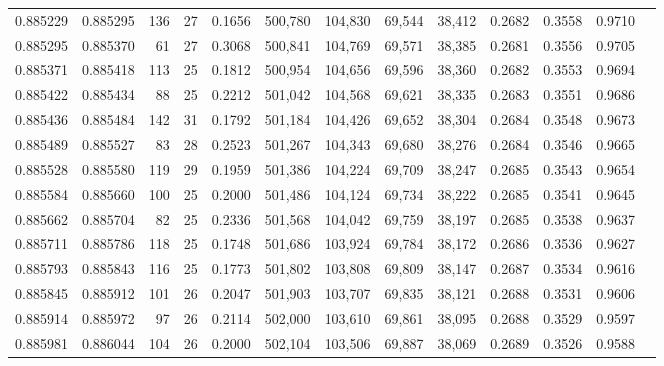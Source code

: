 \begin{tabular}{rrrrrrrrrrrrr}
0.885229 & 0.885295 &   136 &  27 &                                     0.1656 & 500,780 & 104,830 &  69,544 &  38,412 & 0.2682 & 0.3558 & 0.9710 \\
0.885295 & 0.885370 &    61 &  27 &                                     0.3068 & 500,841 & 104,769 &  69,571 &  38,385 & 0.2681 & 0.3556 & 0.9705 \\
0.885371 & 0.885418 &   113 &  25 &                                     0.1812 & 500,954 & 104,656 &  69,596 &  38,360 & 0.2682 & 0.3553 & 0.9694 \\
0.885422 & 0.885434 &    88 &  25 &                                     0.2212 & 501,042 & 104,568 &  69,621 &  38,335 & 0.2683 & 0.3551 & 0.9686 \\
0.885436 & 0.885484 &   142 &  31 &                                     0.1792 & 501,184 & 104,426 &  69,652 &  38,304 & 0.2684 & 0.3548 & 0.9673 \\
0.885489 & 0.885527 &    83 &  28 &                                     0.2523 & 501,267 & 104,343 &  69,680 &  38,276 & 0.2684 & 0.3546 & 0.9665 \\
0.885528 & 0.885580 &   119 &  29 &                                     0.1959 & 501,386 & 104,224 &  69,709 &  38,247 & 0.2685 & 0.3543 & 0.9654 \\
0.885584 & 0.885660 &   100 &  25 &                                     0.2000 & 501,486 & 104,124 &  69,734 &  38,222 & 0.2685 & 0.3541 & 0.9645 \\
0.885662 & 0.885704 &    82 &  25 &                                     0.2336 & 501,568 & 104,042 &  69,759 &  38,197 & 0.2685 & 0.3538 & 0.9637 \\
0.885711 & 0.885786 &   118 &  25 &                                     0.1748 & 501,686 & 103,924 &  69,784 &  38,172 & 0.2686 & 0.3536 & 0.9627 \\
0.885793 & 0.885843 &   116 &  25 &                                     0.1773 & 501,802 & 103,808 &  69,809 &  38,147 & 0.2687 & 0.3534 & 0.9616 \\
0.885845 & 0.885912 &   101 &  26 &                                     0.2047 & 501,903 & 103,707 &  69,835 &  38,121 & 0.2688 & 0.3531 & 0.9606 \\
0.885914 & 0.885972 &    97 &  26 &                                     0.2114 & 502,000 & 103,610 &  69,861 &  38,095 & 0.2688 & 0.3529 & 0.9597 \\
0.885981 & 0.886044 &   104 &  26 &                                     0.2000 & 502,104 & 103,506 &  69,887 &  38,069 & 0.2689 & 0.3526 & 0.9588 \\

\end{tabular}
